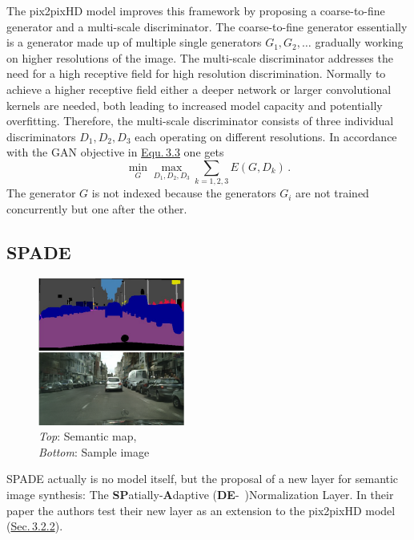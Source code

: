 The pix2pixHD model improves this framework by proposing a coarse-to-fine generator and a multi-scale discriminator. The coarse-to-fine generator essentially is a generator made up of multiple single generators ${G_1, G_2, \dots}$ gradually working on higher resolutions of the image. The multi-scale discriminator addresses the need for a high receptive field for high resolution discrimination. Normally to achieve a higher receptive field either a deeper network or larger convolutional kernels are needed, both leading to increased model capacity and potentially overfitting. Therefore, the multi-scale discriminator consists of three individual discriminators $D_1, D_2, D_3$ each operating on different resolutions. In accordance with the GAN objective in \hyperref[equ:3.3]{Equ.\,3.3} one gets
%
\begin{equation}
    \underset{G}{\min}\underset{D_1,D_2,D_3}{\max}\sum_{k=1,2,3}E(G,D_k)\,.
\end{equation}
%
The generator $G$ is not indexed because the generators $G_i$ are not trained concurrently but one after the other.

\subsection{SPADE} 
%
\begin{figure}
    \begin{center}
        \includegraphics[width=0.43\textwidth]{Chapters/figures/spade_example.PNG}
    \end{center}
    \caption[]{\textit{Top}: Semantic map, \\\textit{Bottom}: Sample image}
\end{figure}
%
SPADE \cite{spade} actually is no model itself, but the proposal of a new layer for semantic image synthesis: The \textbf{SP}atially-\textbf{A}daptive (\textbf{DE}-~)Normalization Layer. In their paper the authors test their new layer as an extension to the pix2pixHD model (\hyperref[sec:3.2.2]{Sec.\,3.2.2}). 

